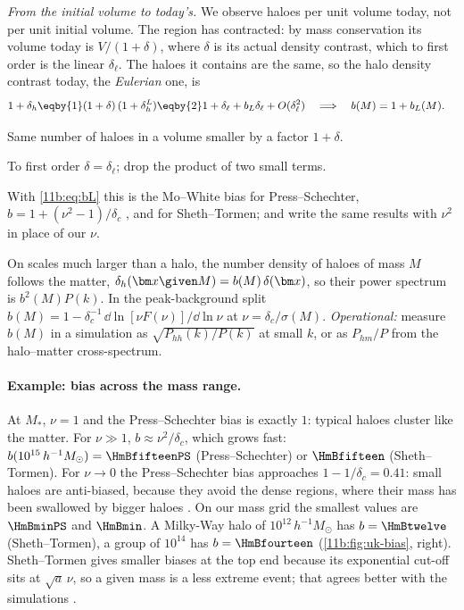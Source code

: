 \emph{From the initial volume to today's.} We observe haloes per unit volume
today, not per unit initial volume. The region has contracted: by mass
conservation its volume today is $V/(1+\delta)$, where $\delta$ is its actual
density contrast, which to first order is the linear $\delta_\ell$. The haloes
it contains are the same, so the halo density contrast today, the
\emph{Eulerian} one, is
\begin{align}
  1+\delta_h
  &\eqby{1}(1+\delta)\,(1+\delta_h^L)
   \eqby{2}1+\delta_\ell+b_L\delta_\ell+O(\delta_\ell^2)
  \quad\Longrightarrow\quad
  b(M)=1+b_L(M).
  \label{11b:eq:pbs-eul}
\end{align}
\begin{explain}
  \item Same number of haloes in a volume smaller by a factor $1+\delta$.
  \item To first order $\delta=\delta_\ell$; drop the product of two small terms.
\end{explain}
With \eqref{11b:eq:bL} this is the Mo--White bias for Press--Schechter,
$b=1+(\nu^2-1)/\delta_c$ \cite{MoWhite1996}, and
 for Sheth--Tormen; 
and  write the same results with $\nu^2$ in place
of our $\nu$.

\begin{workdef}
On scales much larger than a halo, the number density of haloes of mass $M$
follows the matter, $\delta_h(\bm x\given M)=b(M)\,\delta(\bm x)$, so their power
spectrum is $b^2(M)P(k)$. In the peak-background split
$b(M)=1-\delta_c^{-1}\,\dd\ln[\nu F(\nu)]/\dd\ln\nu$ at $\nu=\delta_c/\sigma(M)$.
\emph{Operational:} measure $b(M)$ in a simulation as
$\sqrt{P_{hh}(k)/P(k)}$ at small $k$, or as $P_{hm}/P$ from the halo--matter
cross-spectrum.
\end{workdef}

\paragraph{Example: bias across the mass range.}
At $M_*$, $\nu=1$ and the Press--Schechter bias is exactly $1$: typical haloes
cluster like the matter. For $\nu\gg1$, $b\approx\nu^2/\delta_c$, which grows fast:
$b(10^{15}\,h^{-1}M_\odot)=\HmBfifteenPS$ (Press--Schechter) or $\HmBfifteen$
(Sheth--Tormen). For $\nu\to0$ the Press--Schechter bias approaches
$1-1/\delta_c=0.41$: small haloes are anti-biased, because they avoid the dense
regions, where their mass has been swallowed by bigger haloes
. On our mass grid the smallest values are
$\HmBminPS$ and $\HmBmin$. A Milky-Way halo of $10^{12}\,h^{-1}M_\odot$ has
$b=\HmBtwelve$ (Sheth--Tormen), a group of $10^{14}$ has $b=\HmBfourteen$
(\cref{11b:fig:uk-bias}, right). Sheth--Tormen gives smaller biases at the top
end because its exponential cut-off sits at $\sqrt a\,\nu$, so a given mass is a less
extreme event; that agrees better with the simulations
.

